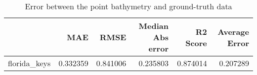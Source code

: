 \begin{table}[h!]
\caption{Error between the point bathymetry and ground-truth data}
\label{tab:florida_keys_lidar_error}
\begin{tabular}{lrrrrr}
\toprule
 & MAE & RMSE & Median Abs error & R2 Score & Average Error \\
\midrule
florida_keys & 0.332359 & 0.841006 & 0.235803 & 0.874014 & 0.207289 \\
\bottomrule
\end{tabular}
\end{table}
